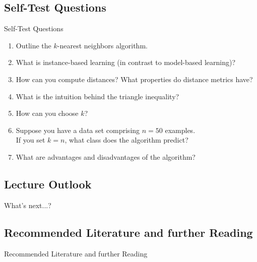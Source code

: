 \subsection{Self-Test Questions}

\begin{frame}{Self-Test Questions}{}\important
	\begin{enumerate}
		\item Outline the $k$-nearest neighbors algorithm.
		\item What is instance-based learning (in contrast to model-based learning)?
		\item How can you compute distances? What properties do distance metrics have?
		\item What is the intuition behind the triangle inequality?
		\item How can you choose $k$?
		\item Suppose you have a data set comprising $n = 50$ examples. \\
			If you set $k = n$, what class does the algorithm predict?
		\item What are advantages and disadvantages of the algorithm?
	\end{enumerate}
\end{frame}


\subsection{Lecture Outlook}

\begin{frame}{What's next...?}{}
\end{frame}


\subsection{Recommended Literature and further Reading}

\begin{frame}{Recommended Literature and further Reading}{}
	\footnotesize
	\begin{thebibliography}{2}

	\end{thebibliography}
\end{frame}


